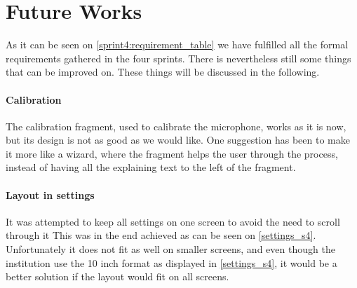 \section{Future Works}
As it can be seen on \cref{sprint4:requirement_table} we have fulfilled all the formal requirements gathered in the four sprints.
There is nevertheless still some things that can be improved on. 
These things will be discussed in the following.

\paragraph{Calibration}
The calibration fragment, used to calibrate the microphone, works as it is now, but its design is not as good as we would like. 
One suggestion has been to make it more like a wizard, where the fragment helps the user through the process, instead of having all the explaining text to the left of the fragment.

\paragraph{Layout in settings}
It was attempted to keep all settings on one screen to avoid the need to scroll through it
This was in the end achieved as can be seen on \cref{settings_s4}.
Unfortunately it does not fit as well on smaller screens, and even though the institution use the 10 inch format as displayed in \cref{settings_s4}, it would be a better solution if the layout would fit on all screens.